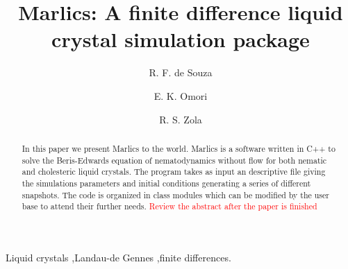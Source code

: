 \documentclass[final,5p,times,twocolumn]{elsarticle}
\begin{document}
\begin{frontmatter}



\title{Marlics: A finite difference liquid crystal simulation package}


\author[a]{R. F. de Souza }
\author[a]{E. K. Omori}
\author[a,b]{R. S. Zola}

\address[a]{Departamento de Física, Universidade Estadual de Maringá, Avenida Colombo 5790,
87020 - 900 Maringá – PR, Brazil}
\address[b]{Universidade Tecnologica Federal do Paraná, Rua Marcilio Dias 635, 86812-460 Apucarana, Paraná,
Brazil}

\begin{abstract}
  In this paper we present Marlics to the world. Marlics is a software
  written in C++ to solve the Beris-Edwards equation of
  nematodynamics without flow for both nematic and cholesteric liquid
  crystals. The program takes as input an descriptive file giving the
  simulations parameters and initial conditions generating a series of
  different snapshots. The code is organized in class modules which
  can be modified by the user base to attend their further needs.
  \textcolor{red}{Review the abstract after the paper is finished}
\end{abstract}

\begin{keyword}
Liquid crystals \sep Landau-de Gennes \sep finite differences.

\end{keyword}

\end{frontmatter}
\end{document}
